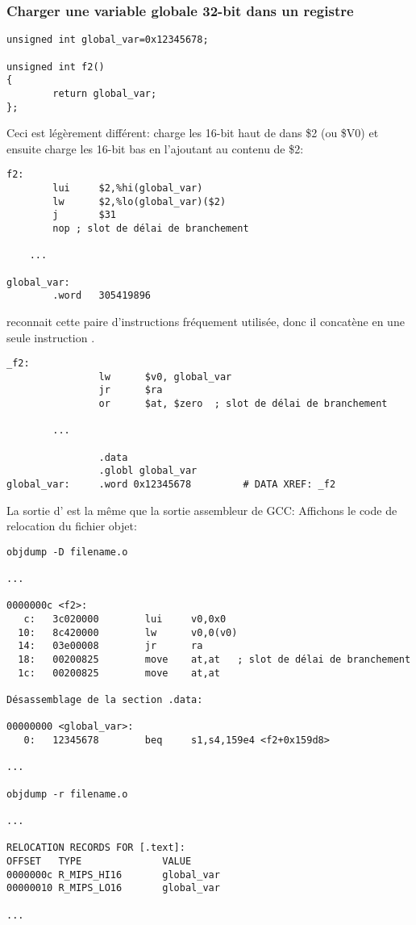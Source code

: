 \subsubsection{Charger une variable globale 32-bit dans un registre}

\begin{lstlisting}[style=customc]
unsigned int global_var=0x12345678;

unsigned int f2()
{
        return global_var;
};
\end{lstlisting}


Ceci est légèrement différent:  charge les 16-bit haut de 
dans \$2 (ou \$V0) et ensuite  charge les 16-bit bas en l'ajoutant au contenu
de \$2:

\begin{lstlisting}[caption=GCC 4.4.5 -O3 (\assemblyOutput),style=customasmMIPS]
f2:
        lui     $2,%hi(global_var)
        lw      $2,%lo(global_var)($2)
        j       $31
        nop	; slot de délai de branchement

	...

global_var:
        .word   305419896
\end{lstlisting}

\IDA reconnait cette paire d'instructions fréquement utilisée, donc il concatène en
une seule instruction .

\begin{lstlisting}[caption=GCC 4.4.5 -O3 (IDA),style=customasmMIPS]
_f2:
                lw      $v0, global_var
                jr      $ra
                or      $at, $zero	; slot de délai de branchement

		...

                .data
                .globl global_var
global_var:     .word 0x12345678         # DATA XREF: _f2
\end{lstlisting}

La sortie d' est la même que la sortie assembleur de GCC:
Affichons le code de relocation du fichier objet:

\begin{lstlisting}[caption=objdump,style=customasmMIPS]
objdump -D filename.o

...

0000000c <f2>:
   c:   3c020000        lui     v0,0x0
  10:   8c420000        lw      v0,0(v0)
  14:   03e00008        jr      ra
  18:   00200825        move    at,at	; slot de délai de branchement
  1c:   00200825        move    at,at

Désassemblage de la section .data:

00000000 <global_var>:
   0:   12345678        beq     s1,s4,159e4 <f2+0x159d8>

...

objdump -r filename.o

...

RELOCATION RECORDS FOR [.text]:
OFFSET   TYPE              VALUE
0000000c R_MIPS_HI16       global_var
00000010 R_MIPS_LO16       global_var

...

\end{lstlisting}

